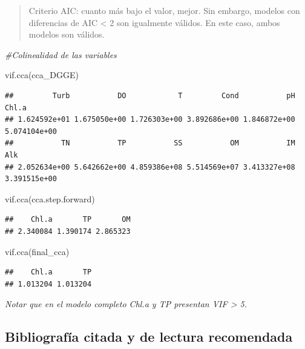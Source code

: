 \documentclass[
]{book}
\newenvironment{Shaded}{\begin{snugshade}}{\end{snugshade}}
\newcommand{\CommentTok}[1]{\textcolor[rgb]{0.56,0.35,0.01}{\textit{#1}}}
\newcommand{\FunctionTok}[1]{\textcolor[rgb]{0.00,0.00,0.00}{#1}}
\newcommand{\NormalTok}[1]{#1}
\begin{document}
\begin{quote}
Criterio AIC: cuanto más bajo el valor, mejor. Sin embargo, modelos con diferencias de AIC \textless{} 2 son igualmente válidos. En este caso, ambos modelos son válidos.
\end{quote}

\begin{Shaded}
\begin{Highlighting}[]
\CommentTok{\#Colinealidad de las variables}

\FunctionTok{vif.cca}\NormalTok{(cca\_DGGE)}
\end{Highlighting}
\end{Shaded}

\begin{verbatim}
##         Turb           DO            T         Cond           pH        Chl.a 
## 1.624592e+01 1.675050e+00 1.726303e+00 3.892686e+00 1.846872e+00 5.074104e+00 
##           TN           TP           SS           OM           IM          Alk 
## 2.052634e+00 5.642662e+00 4.859386e+08 5.514569e+07 3.413327e+08 3.391515e+00
\end{verbatim}

\begin{Shaded}
\begin{Highlighting}[]
\FunctionTok{vif.cca}\NormalTok{(cca.step.forward)}
\end{Highlighting}
\end{Shaded}

\begin{verbatim}
##    Chl.a       TP       OM 
## 2.340084 1.390174 2.865323
\end{verbatim}

\begin{Shaded}
\begin{Highlighting}[]
\FunctionTok{vif.cca}\NormalTok{(final\_cca)}
\end{Highlighting}
\end{Shaded}

\begin{verbatim}
##    Chl.a       TP 
## 1.013204 1.013204
\end{verbatim}

\emph{Notar que en el modelo completo Chl.a y TP presentan VIF \textgreater{} 5.}

\hypertarget{bibliografuxeda-citada-y-de-lectura-recomendada}{%
\subsection{Bibliografía citada y de lectura recomendada}\label{bibliografuxeda-citada-y-de-lectura-recomendada}}
\end{document}
